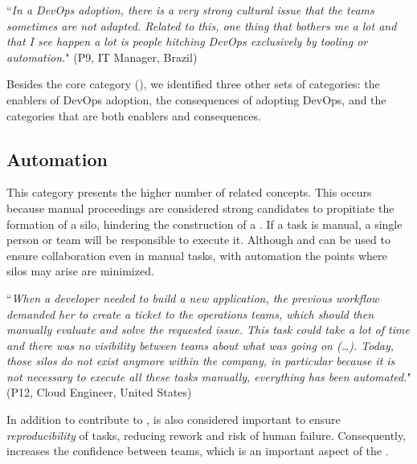 \begin{mq}``\emph{In a DevOps adoption, there is a very strong cultural issue that the teams
sometimes are not adapted. Related to this, one thing that bothers me a lot and
that I see happen a lot is people hitching DevOps exclusively by tooling or
automation.}" (P9, IT Manager, Brazil)
\end{mq}

Besides the core category (\cc), we identified
three other sets of categories: the enablers
of DevOps adoption, the consequences of adopting
DevOps, and the categories that are both enablers and consequences.



\subsection{Automation} \label{ssec:automation}

This category presents the higher number of related concepts. This
occurs because manual proceedings are considered strong candidates to
propitiate the formation of a silo, hindering the construction
of a \cc. If a task is manual, a single person or
team will be responsible to execute it. Although  and  can
be used to ensure collaboration even in manual tasks, with automation the
points where silos may arise are minimized.

\begin{mq}
``\emph{When a developer needed to build a new application, the previous workflow demanded her
to create a ticket to the operations teams, which should then manually evaluate and solve
the requested issue. This task could take a lot of time and there was no
visibility between teams about what was going on (\ldots). Today, those silos do not exist
anymore within the company, in particular because it is not necessary to execute all these tasks manually,
everything has been automated.}" (P12, Cloud Engineer, United States)
\end{mq}

In addition to contribute to ,  is also considered
important to ensure \emph{reproducibility} of tasks, reducing rework and risk of
human failure. Consequently,  increases the confidence
between teams, which is an important aspect of the \cc.


